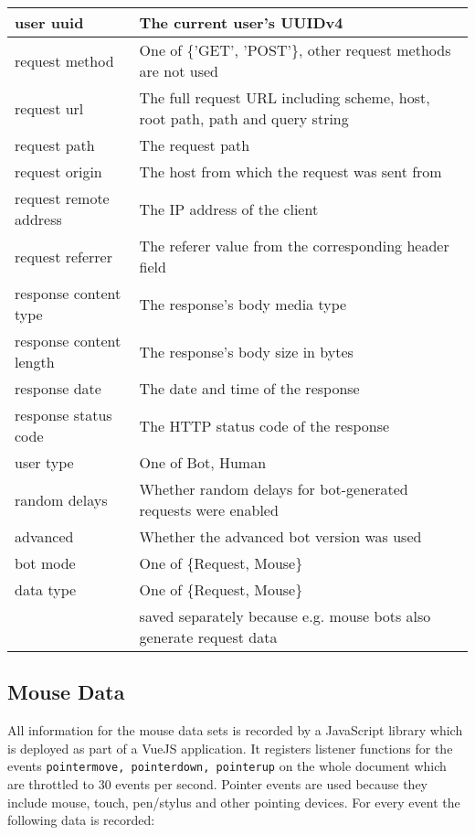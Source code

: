 \documentclass[
    fontsize=12pt,
    headings=small,
    parskip=half,           %
    bibliography=totoc,
    numbers=noenddot,       %
    open=any,               %
    final                   %
    ]{scrreprt}
\begin{document}
\begin{table}[]
\begin{tabular}{|l|l|}
\hline
user uuid & The current user's UUIDv4 \\ \hline
request method & One of \{'GET', 'POST'\}, other request methods are not used \\ \hline
request url & The full request URL including scheme, host, root path, path and query string \\ \hline
request path & The request path \\ \hline
request origin & The host from which the request was sent from \\ \hline
request remote address & The IP address of the client \\ \hline
request referrer & The referer value from the corresponding header field \\ \hline
response content type & The response's body media type \\ \hline
response content length & The response's body size in bytes \\ \hline
response date & The date and time of the response \\ \hline
response status code & The HTTP status code of the response \\ \hline
user type & One of {Bot, Human} \\ \hline
random delays & Whether random delays for bot-generated requests were enabled \\ \hline
advanced & Whether the advanced bot version was used \\ \hline
bot mode & One of \{Request, Mouse\} \\ \hline
data type & One of \{Request, Mouse\} \\ & saved separately because e.g. mouse bots also generate request data \\ \hline

\end{tabular}
\end{table}

\subsection{Mouse Data}

All information for the mouse data sets is recorded by a JavaScript library which is deployed as part of a VueJS application. It registers listener functions for the events \lstinline{pointermove, pointerdown, pointerup} on the whole document which are throttled to $30$ events per second. Pointer events are used because they include mouse, touch, pen/stylus and other pointing devices. For every event the following data is recorded:
\end{document}
